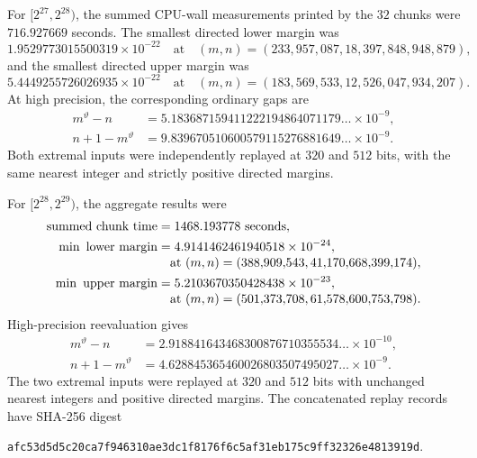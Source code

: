 \documentclass[11pt]{article}
\newcommand{\sha}[1]{\texttt{\footnotesize #1}}
\newcommand{\1}{\mathbf 1}
\theoremstyle{plain}
\theoremstyle{definition}
\theoremstyle{remark}
\begin{document}
For $[2^{27},2^{28})$, the summed CPU-wall measurements printed by the
$32$ chunks were $716.927669$ seconds.  The smallest directed lower margin was
\begin{equation}\label{eq:scan28-lower}
 1.9529773015500319\times10^{-22}
 \quad\text{at}\quad
 (m,n)=(233{,}957{,}087,18{,}397{,}848{,}948{,}879),
\end{equation}
and the smallest directed upper margin was
\begin{equation}\label{eq:scan28-upper}
 5.4449255726026935\times10^{-22}
 \quad\text{at}\quad
 (m,n)=(183{,}569{,}533,12{,}526{,}047{,}934{,}207).
\end{equation}
At high precision, the corresponding ordinary gaps are
\begin{align}
 m^\vartheta-n
 &=5.183687159411222194864071179\ldots\times10^{-9},
 \label{eq:scan28-actual-lower}\\
 n+1-m^\vartheta
 &=9.839670510600579115276881649\ldots\times10^{-9}.
 \label{eq:scan28-actual-upper}
\end{align}
Both extremal inputs were independently replayed at $320$ and $512$ bits,
with the same nearest integer and strictly positive directed margins.

For $[2^{28},2^{29})$, the aggregate results were
\begin{align}
 \text{summed chunk time}&=1468.193778\ \text{seconds},\\
 \min\text{ lower margin}&=4.9141462461940518\times10^{-24},\notag\\[-0.25em]
 &\quad\text{at }(m,n)=(388{,}909{,}543,41{,}170{,}668{,}399{,}174),\label{eq:scan29-lower}\\
 \min\text{ upper margin}&=5.2103670350428438\times10^{-23},\notag\\[-0.25em]
 &\quad\text{at }(m,n)=(501{,}373{,}708,61{,}578{,}600{,}753{,}798).\label{eq:scan29-upper}
\end{align}
High-precision reevaluation gives
\begin{align}
 m^\vartheta-n&=2.918841643468300876710355534\ldots\times10^{-10},\label{eq:scan29-actual-lower}\\
 n+1-m^\vartheta&=4.628845365460026803507495027\ldots\times10^{-9}.\label{eq:scan29-actual-upper}
\end{align}
The two extremal inputs were replayed at $320$ and $512$ bits with unchanged
nearest integers and positive directed margins.  The concatenated replay records have SHA-256 digest
\begin{center}
\sha{afc53d5d5c20ca7f946310ae3dc1f8176f6c5af31eb175c9ff32326e4813919d}.
\end{center}
\end{document}
